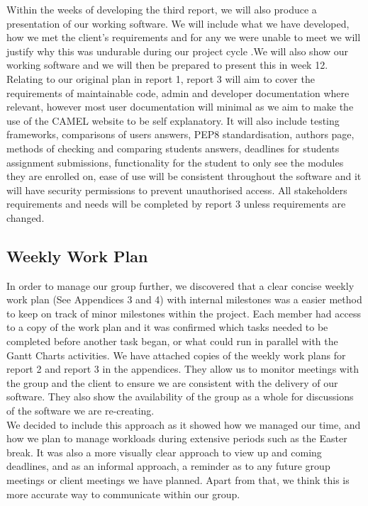 Within the weeks of developing the third report, we will also produce a presentation of our working software. We will include what we have developed, how we met the client's requirements and for any we were unable to meet we will justify why this was undurable during our project cycle .We will also show our working software and we will then be prepared to present this in week 12. \\

Relating to our original plan in report 1, report 3 will aim to cover the requirements of maintainable code, admin and developer documentation where relevant, however most user documentation will minimal as we aim to make the use of the CAMEL website to be self explanatory. It will also include testing frameworks, comparisons of users answers, PEP8 standardisation, authors page, methods of checking and comparing students answers, deadlines for students assignment submissions, functionality for the student to only see the modules they are enrolled on, ease of use will be consistent throughout the software and it will have security permissions to prevent unauthorised access. All stakeholders requirements and needs will be completed by report 3 unless requirements are changed.\\



\subsection*{Weekly Work Plan}

In order to manage our group further, we discovered that a clear concise weekly work plan (See Appendices 3 and 4) with internal milestones was a easier method to keep on track of minor milestones within the project. Each member had access to a copy of the work plan and it was confirmed which tasks needed to be completed before another task began, or what could run in parallel with the Gantt Charts activities. We have attached copies of the weekly work plans for report 2 and report 3 in the appendices. They allow us to monitor meetings with the group and the client to ensure we are consistent with the delivery of our software. They also show the availability of the group as a whole for discussions of the software we are re-creating. \\

We decided to include this approach as it showed how we managed our time, and how we plan to manage workloads during extensive periods such as the Easter break. It was also a more visually clear approach to view up and coming deadlines, and as an informal approach, a reminder as to any future  group meetings or client meetings we have planned. Apart from that, we think this is more accurate way  to communicate within our group. \\

